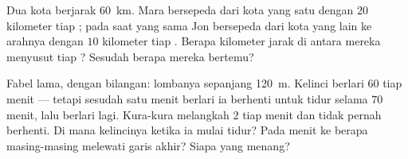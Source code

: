 \begin{exercise}[$\star\star$]\label{exo:g5:speed-distance-time:10}
Dua kota berjarak \qty{60}{km}. Mara bersepeda dari kota yang satu
dengan $20$ kilometer tiap ; pada saat yang sama Jon bersepeda dari
kota yang lain ke arahnya dengan $10$ kilometer tiap . Berapa
kilometer jarak di antara mereka menyusut tiap ? Sesudah berapa 
mereka bertemu?
\end{exercise}

\begin{exercise}[$\star\star$]\label{exo:g5:speed-distance-time:11}
Fabel lama, dengan bilangan: lombanya sepanjang \qty{120}{m}. Kelinci
berlari $60$  tiap menit --- tetapi sesudah satu menit berlari ia
berhenti untuk tidur selama $70$ menit, lalu berlari lagi. Kura-kura
melangkah $2$  tiap menit dan tidak pernah berhenti. Di mana
kelincinya ketika ia mulai tidur? Pada menit ke berapa masing-masing
melewati garis akhir? Siapa yang menang?
\end{exercise}

